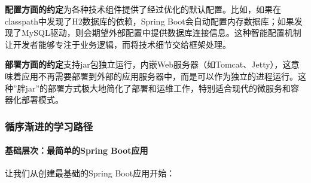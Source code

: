 \textbf{配置方面的约定}为各种技术组件提供了经过优化的默认配置。比如，如果在classpath中发现了H2数据库的依赖，Spring Boot会自动配置内存数据库；如果发现了MySQL驱动，则会期望外部配置中提供数据库连接信息。这种智能配置机制让开发者能够专注于业务逻辑，而将技术细节交给框架处理。

\textbf{部署方面的约定}支持jar包独立运行，内嵌Web服务器（如Tomcat、Jetty），这意味着应用不再需要部署到外部的应用服务器中，而是可以作为独立的进程运行。这种''胖jar''的部署方式极大地简化了部署和运维工作，特别适合现代的微服务和容器化部署模式。

\subsubsection{循序渐进的学习路径}\label{ux5faaux5e8fux6e10ux8fdbux7684ux5b66ux4e60ux8defux5f84}

\paragraph{基础层次：最简单的Spring Boot应用}\label{ux57faux7840ux5c42ux6b21ux6700ux7b80ux5355ux7684spring-bootux5e94ux7528}

让我们从创建最基础的Spring Boot应用开始：


